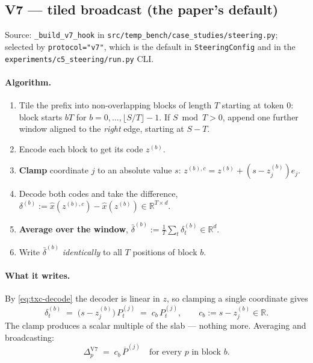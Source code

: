 \documentclass[11pt]{article}
\theoremstyle{definition}
\newcommand{\Rbb}{\mathbb{R}}
\newcommand{\slab}{P}
\newcommand{\dc}{\overline{\slab}}
\begin{document}
\subsection{V7 --- tiled broadcast (the paper's default)}
\label{sec:v7}

Source: \verb|_build_v7_hook| in \verb|src/temp_bench/case_studies/steering.py|; selected by
\verb|protocol="v7"|, which is the default in \verb|SteeringConfig| and in the
\verb|experiments/c5_steering/run.py| CLI.

\paragraph{Algorithm.}
\begin{enumerate}
  \item Tile the prefix into non-overlapping blocks of length $T$ starting at token $0$:
        block starts $b T$ for $b = 0,\dots,\lfloor S/T\rfloor - 1$. If $S \bmod T > 0$, append
        one further window aligned to the \emph{right} edge, starting at $S-T$.
  \item Encode each block to get its code $z^{(b)}$.
  \item \textbf{Clamp} coordinate $j$ to an absolute value $s$: $z^{(b),c} = z^{(b)} + (s - z^{(b)}_j)e_j$.
  \item Decode both codes and take the difference,
        $\delta^{(b)} := \hat{x}(z^{(b),c}) - \hat{x}(z^{(b)}) \in \Rbb^{T\times d}$.
  \item \textbf{Average over the window}, $\bar\delta^{(b)} := \tfrac1T\sum_t \delta^{(b)}_t \in \Rbb^d$.
  \item Write $\bar\delta^{(b)}$ \emph{identically} to all $T$ positions of block $b$.
\end{enumerate}

\paragraph{What it writes.} By \eqref{eq:txc-decode} the decoder is linear in $z$, so clamping a
single coordinate gives
\begin{equation}
  \delta^{(b)}_t \;=\; \bigl(s - z^{(b)}_j\bigr)\,\slab^{(j)}_t
  \;=\; c_b\, \slab^{(j)}_t,
  \qquad c_b := s - z^{(b)}_j \in \Rbb .
  \label{eq:clamp-delta}
\end{equation}
The clamp produces a scalar multiple of the slab --- nothing more. Averaging and broadcasting:
\begin{equation}
  \boxed{\;\Delta^{\mathrm{V7}}_p \;=\; c_b\,\dc^{(j)}
  \quad\text{for every }p\text{ in block }b.\;}
  \label{eq:v7-write}
\end{equation}
\end{document}
